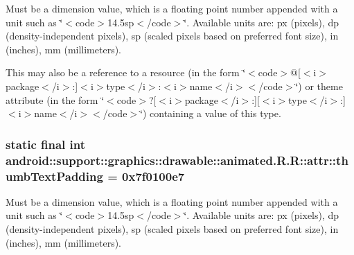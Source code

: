 Must be a dimension value, which is a floating point number appended with a unit such as \char`\"{}$<$code$>$14.5sp$<$/code$>$\char`\"{}. Available units are: px (pixels), dp (density-independent pixels), sp (scaled pixels based on preferred font size), in (inches), mm (millimeters). 

This may also be a reference to a resource (in the form \char`\"{}$<$code$>$@\mbox{[}$<$i$>$package$<$/i$>$:\mbox{]}$<$i$>$type$<$/i$>$:$<$i$>$name$<$/i$>$$<$/code$>$\char`\"{}) or theme attribute (in the form \char`\"{}$<$code$>$?\mbox{[}$<$i$>$package$<$/i$>$:\mbox{]}\mbox{[}$<$i$>$type$<$/i$>$:\mbox{]}$<$i$>$name$<$/i$>$$<$/code$>$\char`\"{}) containing a value of this type. \hypertarget{classandroid_1_1support_1_1graphics_1_1drawable_1_1animated_1_1_r_1_1attr_677cfea7a5cff8a3110b0f00010f9da3}{
\subsubsection[{thumbTextPadding}]{\setlength{\rightskip}{0pt plus 5cm}static final int android::support::graphics::drawable::animated.R.R::attr::thumbTextPadding = 0x7f0100e7}}
\label{classandroid_1_1support_1_1graphics_1_1drawable_1_1animated_1_1_r_1_1attr_677cfea7a5cff8a3110b0f00010f9da3}


Must be a dimension value, which is a floating point number appended with a unit such as \char`\"{}$<$code$>$14.5sp$<$/code$>$\char`\"{}. Available units are: px (pixels), dp (density-independent pixels), sp (scaled pixels based on preferred font size), in (inches), mm (millimeters). 

